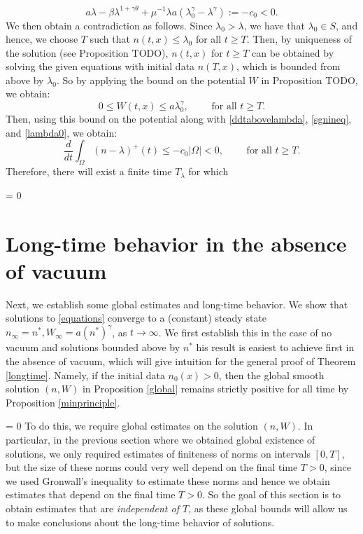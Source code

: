 \documentclass[12pt]{article}
\theoremstyle{plain}
\begin{document}
\begin{equation}\label{lambda0}
a\lambda - \beta\lambda^{1 + \gamma \theta} + \mu^{-1}\lambda a(\lambda_{0}^{\gamma} - \lambda^{\gamma}) := -c_0 < 0.
\end{equation}
We then obtain a contradiction as follows. Since $\lambda_0 > \lambda$, we have that $\lambda_0 \in S$, and hence, we choose $T$ such that $n(t, x) \le \lambda_0$ for all $t \ge T$. Then, by uniqueness of the solution (see Proposition TODO), $n(t, x)$ for $t \ge T$ can be obtained by solving the given equations with initial data $n(T, x)$, which is bounded from above by $\lambda_0$. So by applying the bound on the potential $W$ in Proposition TODO, we obtain:
\begin{equation*}
0 \le W(t, x) \le a\lambda_0^{\gamma}, \qquad \text{ for all } t \ge T.
\end{equation*}
Then, using this bound on the potential along with \eqref{ddtabovelambda}, \eqref{sgnineq}, and \eqref{lambda0}, we obtain:
\begin{equation*}
\frac{d}{dt}\int_{\Omega}(n - \lambda)^{+} (t) \le -c_0 |\Omega| < 0, \qquad \text{ for all $t \ge T$.}
\end{equation*}
Therefore, there will exist a finite time $T_{\lambda}$ for which 

\fi

 = 0
\section{Long-time behavior in the absence of vacuum}\label{novacuumlongtime}

Next, we establish some global estimates and long-time behavior. We show that solutions to \eqref{equations} converge to a (constant) steady state $n_{\infty} = n^{*}, W_{\infty} = a(n^{*})^{\gamma}$,
as $t \to \infty$. We first establish this in the case of no vacuum and solutions bounded above by $n^{*}$ his result is easiest to achieve first in the absence of vacuum, which will give intuition for the general proof of Theorem \ref{longtime}. Namely, if the initial data $n_{0}(x) > 0$, then the global smooth solution $(n, W)$ in Proposition \ref{global} remains strictly positive for all time by Proposition \ref{minprinciple}.

 = 0
To do this, we require global estimates on the solution $(n, W)$. In particular, in the previous section where we obtained global existence of solutions, we only required estimates of finiteness of norms on intervals $[0, T]$, but the size of these norms could very well depend on the final time $T > 0$, since we used Gronwall's inequality to estimate these norms and hence we obtain estimates that depend on the final time $T > 0$. So the goal of this section is to obtain estimates that are \textit{independent of $T$}, as these global bounds will allow us to make conclusions about the long-time behavior of solutions.
\end{document}
